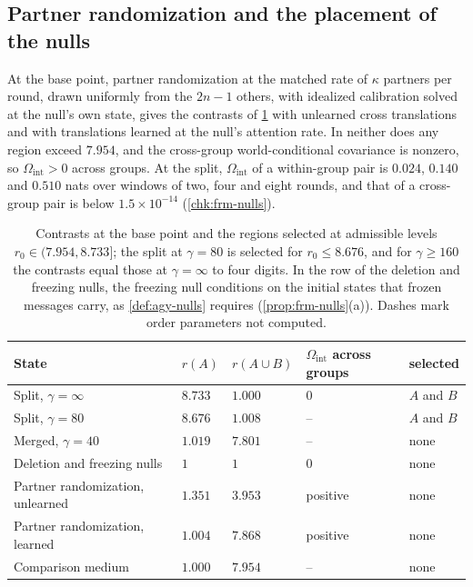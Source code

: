 \subsection{Partner randomization and the placement of the nulls}\label{sup:frm-partner-randomization-and-the-placement}

\begin{observation}\label{obs:frm-partner}
At the base point, partner randomization at the matched rate of $\kappa$ partners per round, drawn uniformly from the $2n-1$ others, with idealized calibration solved at the null's own state, gives the contrasts of \cref{tab:frm-nulls} with unlearned cross translations and with translations learned at the null's attention rate. In neither does any region exceed $7.954$, and the cross-group world-conditional covariance is nonzero, so $\Omega_{\mathrm{int}}>0$ across groups. At the split, $\Omega_{\mathrm{int}}$ of a within-group pair is $0.024$, $0.140$ and $0.510$ nats over windows of two, four and eight rounds, and that of a cross-group pair is below $1.5\times10^{-14}$ (\cref{chk:frm-nulls}).
\end{observation}

\begin{table}[t]
\centering
\caption{Contrasts at the base point and the regions selected at admissible levels $r_0\in(7.954,8.733]$; the split at $\gamma=80$ is selected for $r_0\le8.676$, and for $\gamma\ge160$ the contrasts equal those at $\gamma=\infty$ to four digits. In the row of the deletion and freezing nulls, the freezing null conditions on the initial states that frozen messages carry, as \cref{def:agy-nulls} requires (\cref{prop:frm-nulls}(a)). Dashes mark order parameters not computed.}
\label{tab:frm-nulls}
\begin{tabular}{@{}lllll@{}}
\toprule
State & $r(A)$ & $r(A\cup B)$ & $\Omega_{\mathrm{int}}$ across groups & selected \\
\midrule
Split, $\gamma=\infty$ & $8.733$ & $1.000$ & $0$ & $A$ and $B$ \\
Split, $\gamma=80$ & $8.676$ & $1.008$ & -- & $A$ and $B$ \\
Merged, $\gamma=40$ & $1.019$ & $7.801$ & -- & none \\
Deletion and freezing nulls & $1$ & $1$ & $0$ & none \\
Partner randomization, unlearned & $1.351$ & $3.953$ & positive & none \\
Partner randomization, learned & $1.004$ & $7.868$ & positive & none \\
Comparison medium & $1.000$ & $7.954$ & -- & none \\
\bottomrule
\end{tabular}
\end{table}

